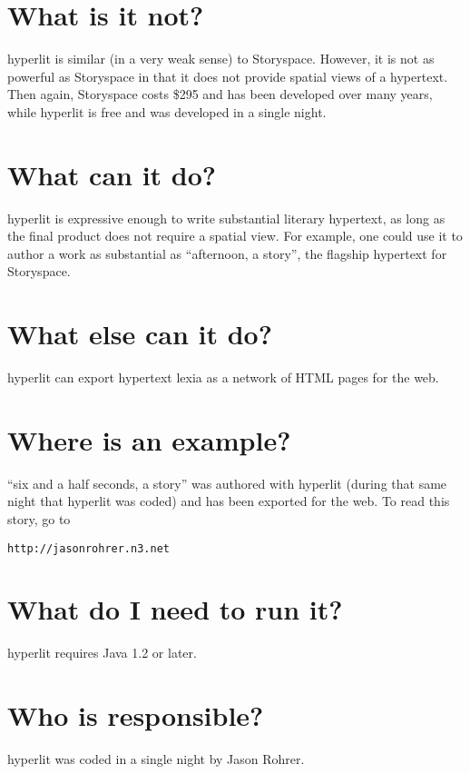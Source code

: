 \documentclass[12pt]{article}
\begin{document}
\section{What is it not?}
hyperlit is similar (in a very weak sense) to Storyspace.  However, it is not as powerful as Storyspace in that it does not provide spatial views of a hypertext.  Then again, Storyspace costs \$295 and has been developed over many years, while hyperlit is free and was developed in a single night.

\section{What can it do?}
hyperlit is expressive enough to write substantial literary hypertext, as long as the final product does not require a spatial view.  For example, one could use it to author a work as substantial as ``afternoon, a story'', the flagship hypertext for Storyspace.

\section{What else can it do?}
hyperlit can export hypertext lexia as a network of HTML pages for the web.

\section{Where is an example?}
``six and a half seconds, a story'' was authored with hyperlit (during that same night that hyperlit was coded) and has been exported for the web.  To read this story, go to
\begin{center}
{\tt http://jasonrohrer.n3.net}
\end{center}

\section{What do I need to run it?}
hyperlit requires Java 1.2 or later.

\section{Who is responsible?}
hyperlit was coded in a single night by Jason Rohrer.

\end{document}
